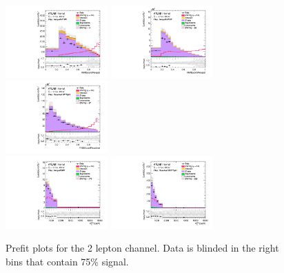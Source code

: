 \begin{figure}[ht]
    \centering
    \includegraphics[width=0.35\textwidth]{figures/2lep/FitResults/Region_distRNNScoreMerged_DSRVBSHP_BMin0_J0_incJet1_L2_T0_incFat1_Y6051_incTag1_Fat1_Prefit.pdf}
    \includegraphics[width=0.35\textwidth]{figures/2lep/FitResults/Region_distRNNScoreMerged_DSRVBSLP_BMin0_J0_incJet1_L2_T0_incFat1_Y6051_incTag1_Fat1_Prefit.pdf}
    \includegraphics[width=0.35\textwidth]{figures/2lep/FitResults/Region_distRNNScoreResolved_DSRVBSFid_BMin0_T0_Y6051_incTag1_J2_L2_incJet1_Prefit.pdf}
    \\
    \includegraphics[width=0.35\textwidth]{figures/2lep/FitResults/Region_distMTagMerJets_DCRVjet_BMin0_J0_incJet1_L2_T0_incFat1_Y6051_incTag1_Fat1_Prefit.pdf}
    \includegraphics[width=0.35\textwidth]{figures/2lep/FitResults/Region_distMTagResJets_DCRVjetFid_BMin0_T0_Y6051_incTag1_J2_L2_incJet1_Prefit.pdf}
    \caption{Prefit plots for the 2 lepton channel. Data is blinded in the right bins that contain 75\% signal.}
       \label{fig:fit_2lep_prefit}
\end{figure}

